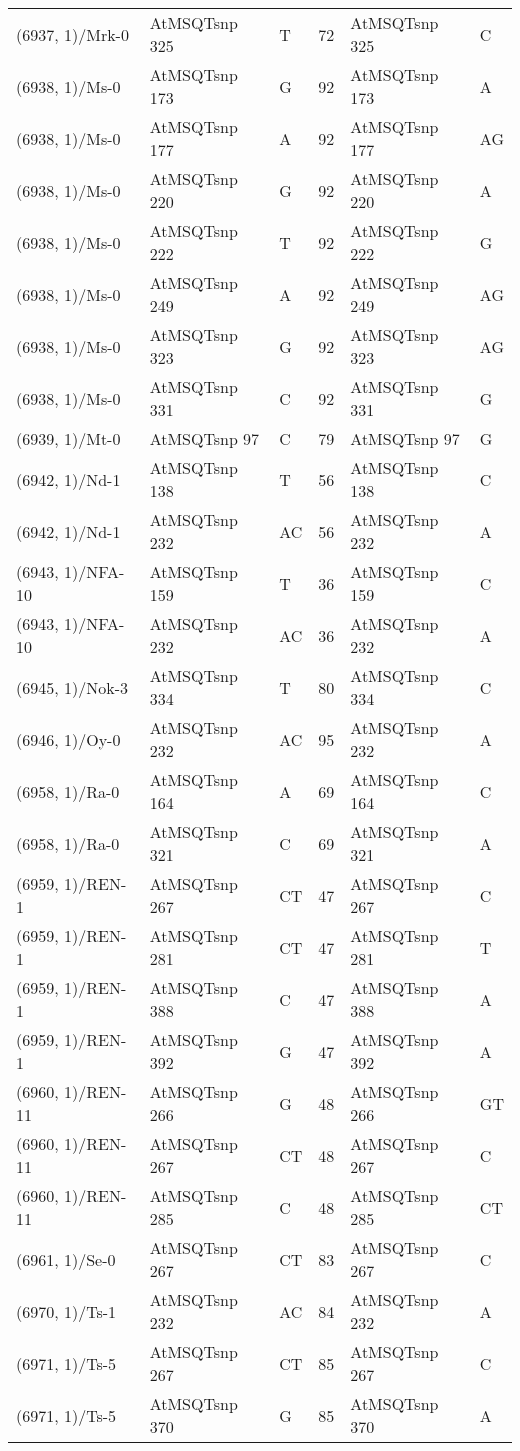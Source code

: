 \begin{center}
\begin{longtable}{|l|l|l|l|l|l|}
(6937, 1)/Mrk-0&AtMSQTsnp 325&T&72&AtMSQTsnp 325&C\\
(6938, 1)/Ms-0&AtMSQTsnp 173&G&92&AtMSQTsnp 173&A\\
(6938, 1)/Ms-0&AtMSQTsnp 177&A&92&AtMSQTsnp 177&AG\\
(6938, 1)/Ms-0&AtMSQTsnp 220&G&92&AtMSQTsnp 220&A\\
(6938, 1)/Ms-0&AtMSQTsnp 222&T&92&AtMSQTsnp 222&G\\
(6938, 1)/Ms-0&AtMSQTsnp 249&A&92&AtMSQTsnp 249&AG\\
(6938, 1)/Ms-0&AtMSQTsnp 323&G&92&AtMSQTsnp 323&AG\\
(6938, 1)/Ms-0&AtMSQTsnp 331&C&92&AtMSQTsnp 331&G\\
(6939, 1)/Mt-0&AtMSQTsnp 97&C&79&AtMSQTsnp 97&G\\
(6942, 1)/Nd-1&AtMSQTsnp 138&T&56&AtMSQTsnp 138&C\\
(6942, 1)/Nd-1&AtMSQTsnp 232&AC&56&AtMSQTsnp 232&A\\
(6943, 1)/NFA-10&AtMSQTsnp 159&T&36&AtMSQTsnp 159&C\\
(6943, 1)/NFA-10&AtMSQTsnp 232&AC&36&AtMSQTsnp 232&A\\
(6945, 1)/Nok-3&AtMSQTsnp 334&T&80&AtMSQTsnp 334&C\\
(6946, 1)/Oy-0&AtMSQTsnp 232&AC&95&AtMSQTsnp 232&A\\
(6958, 1)/Ra-0&AtMSQTsnp 164&A&69&AtMSQTsnp 164&C\\
(6958, 1)/Ra-0&AtMSQTsnp 321&C&69&AtMSQTsnp 321&A\\
(6959, 1)/REN-1&AtMSQTsnp 267&CT&47&AtMSQTsnp 267&C\\
(6959, 1)/REN-1&AtMSQTsnp 281&CT&47&AtMSQTsnp 281&T\\
(6959, 1)/REN-1&AtMSQTsnp 388&C&47&AtMSQTsnp 388&A\\
(6959, 1)/REN-1&AtMSQTsnp 392&G&47&AtMSQTsnp 392&A\\
(6960, 1)/REN-11&AtMSQTsnp 266&G&48&AtMSQTsnp 266&GT\\
(6960, 1)/REN-11&AtMSQTsnp 267&CT&48&AtMSQTsnp 267&C\\
(6960, 1)/REN-11&AtMSQTsnp 285&C&48&AtMSQTsnp 285&CT\\
(6961, 1)/Se-0&AtMSQTsnp 267&CT&83&AtMSQTsnp 267&C\\
(6970, 1)/Ts-1&AtMSQTsnp 232&AC&84&AtMSQTsnp 232&A\\
(6971, 1)/Ts-5&AtMSQTsnp 267&CT&85&AtMSQTsnp 267&C\\
(6971, 1)/Ts-5&AtMSQTsnp 370&G&85&AtMSQTsnp 370&A\\

\end{longtable}
\end{center}
